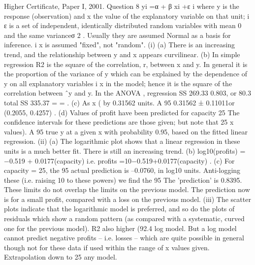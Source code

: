 \documentclass[a4paper,12pt]{article}
\begin{document}
Higher Certificate, Paper I, 2001. Question 8
yi =α + β xi +ε i
where y is the response (observation) and x the value of the explanatory variable on
that unit; { } i
ε is a set of independent, identically distributed random variables with
mean 0 and the same varianceσ 2 . Usually they are assumed Normal as a basis for
inference. i x is assumed "fixed", not "random".
(i) (a) There is an increasing trend, and the relationship between y and x
appears curvilinear.
(b) In simple regression R2 is the square of the correlation, r, between x
and y. In general it is the proportion of the variance of y which can be
explained by the dependence of y on all explanatory variables { } i x in the
model; hence it is the square of the correlation between ˆy and y.
In the ANOVA , regression SS 269.33 0.803, or 80.3%
total SS 335.37
= = .
(c) As x (%
by 0.31562 units.
A 95%
0.31562 ± 0.11011or (0.2055, 0.4257) .
(d) Values of profit have been predicted for capacity 25%
The confidence intervals for these predictions are those given; but note that
25%
x values). A 95%
true y at a given x with probability 0.95, based on the fitted linear regression.
(ii) (a) The logarithmic plot shows that a linear regression in these units is a
much better fit. There is still an increasing trend.
(b) log10(profits) = −0.519 + 0.0177(capacity)
i.e. profits =10−0.519+0.0177(capacity) .
(c) For capacity = 25, the 95%
actual prediction is –0.0760, in log10 units. Anti-logging these (i.e. raising 10
to these powers) we find the 95%
The 'prediction' is 0.8395.
These limits do not overlap the limits on the previous model.
The prediction now is for a small profit, compared with a loss on the previous
model.
(iii) The scatter plots indicate that the logarithmic model is preferred, and so do the
plots of residuals which show a random pattern (as compared with a
systematic, curved one for the previous model). R2 also higher (92.4%
log model.
But a log model cannot predict negative profits – i.e. losses – which are quite
possible in general though not for these data if used within the range of x
values given.
Extrapolation down to 25%
any model.
\end{document}
